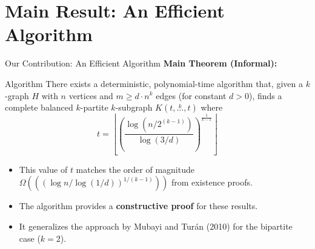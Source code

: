 \documentclass{beamer}
\newcommand{\compoverset}[2]{\ensuremath{K\left(#2, \overset{#1}{\dots}, #2\right)}} %
\newcommand{\OmegaBig}[1]{\ensuremath{\Omega\left(#1\right)}} %
\begin{document}
\section{Main Result: An Efficient Algorithm}

\begin{frame}{Our Contribution: An Efficient Algorithm}
  \textbf{Main Theorem (Informal):}
  \begin{block}{Algorithm}
    There exists a deterministic, polynomial-time algorithm that, given a $k$-graph $H$ with $n$ vertices and $m \ge d \cdot n^k$ edges (for constant $d>0$), finds a complete balanced $k$-partite $k$-subgraph $\compoverset{k}{t}$ where
    $$ t = \left\lfloor \left(  \frac{\log \left(n/2^{(k-1)}\right)}{\log (3/d)} \right)^{\frac{1}{k-1}} \right\rfloor $$
  \end{block}
  \pause
  \begin{itemize}
    \item This value of $t$ matches the order of magnitude $\OmegaBig{((\log n / \log(1/d))^{1/(k-1)})}$ from existence proofs.
    \pause
    \item The algorithm provides a \textbf{constructive proof} for these results.
    \pause
    \item It generalizes the approach by Mubayi and Turán (2010) for the bipartite case ($k=2$).
  \end{itemize}
\end{frame}
\end{document}
